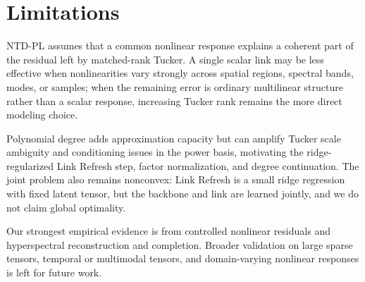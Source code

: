 \section{Limitations}
\label{sec:limitations}

NTD-PL assumes that a common nonlinear response explains a coherent part of the
residual left by matched-rank Tucker. A single scalar link may be less
effective when nonlinearities vary strongly across spatial regions, spectral
bands, modes, or samples; when the remaining error is ordinary multilinear
structure rather than a scalar response, increasing Tucker rank remains the
more direct modeling choice.

Polynomial degree adds approximation capacity but can amplify Tucker scale
ambiguity and conditioning issues in the power basis, motivating the
ridge-regularized Link Refresh step, factor normalization, and degree
continuation. The joint problem also remains nonconvex: Link Refresh is a
small ridge regression with fixed latent tensor, but the backbone and link are
learned jointly, and we do not claim global optimality.

Our strongest empirical evidence is from controlled nonlinear residuals and
hyperspectral reconstruction and completion. Broader validation on large sparse
tensors, temporal or multimodal tensors, and domain-varying nonlinear
responses is left for future work.
